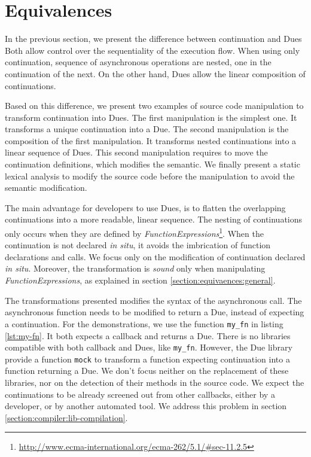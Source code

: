 \section{Equivalences} \label{section:equivalences}

In the previous section, we present the difference between continuation and Dues
Both allow control over the sequentiality of the execution flow.
When using only continuation, sequence of asynchronous operations are nested, one in the continuation of the next. 
On the other hand, Dues allow the linear composition of continuations.

Based on this difference, we present two examples of source code manipulation to transform continuation into Dues.
The first manipulation is the simplest one.
It transforms a unique continuation into a Due.
The second manipulation is the composition of the first manipulation.
It transforms nested continuations into a linear sequence of Dues.
This second manipulation requires to move the continuation definitions, which modifies the semantic.
We finally present a static lexical analysis to modify the source code before the manipulation to avoid the semantic modification.

The main advantage for developers to use Dues, is to flatten the overlapping continuations into a more readable, linear sequence.
The nesting of continuations only occurs when they are defined by \textit{FunctionExpressions}\footnote{\url{http://www.ecma-international.org/ecma-262/5.1/\#sec-11.2.5}}.
When the continuation is not declared \textit{in situ}, it avoids the imbrication of function declarations and calls.
We focus only on the modification of continuation declared \textit{in situ}.
Moreover, the transformation is \textit{sound} only when manipulating \textit{FunctionExpressions}, as explained in section \ref{section:equivaences:general}.

The transformations presented modifies the syntax of the asynchronous call.
The asynchronous function needs to be modified to return a Due, instead of expecting a continuation.
For the demonstrations, we use the function \texttt{my_fn} in listing \ref{lst:my-fn}.
It both expects a callback and returns a Due.
There is no libraries compatible with both callback and Dues, like \texttt{my_fn}.
However, the Due library provide a function \texttt{mock} to transform a function expecting continuation into a function returning a Due.
We don't focus neither on the replacement of these libraries, nor on the detection of their methods in the source code.
We expect the continuations to be already screened out from other callbacks, either by a developer, or by another automated tool.
We address this problem in section \ref{section:compiler:lib-compilation}.

